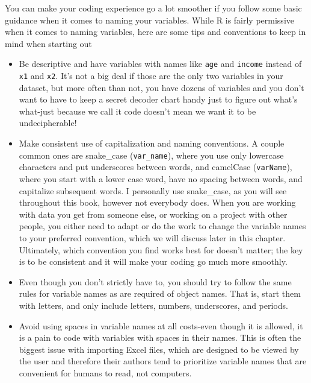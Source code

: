 \documentclass[
  letterpaper,
]{book}
\begin{document}
\begin{tcolorbox}[enhanced jigsaw, colframe=quarto-callout-tip-color-frame, breakable, arc=.35mm, bottomtitle=1mm, bottomrule=.15mm, colbacktitle=quarto-callout-tip-color!10!white, rightrule=.15mm, colback=white, opacityback=0, opacitybacktitle=0.6, coltitle=black, left=2mm, toptitle=1mm, toprule=.15mm, titlerule=0mm, leftrule=.75mm, title=\textcolor{quarto-callout-tip-color}{\faLightbulb}\hspace{0.5em}{Tip from the Helpdesk: What's in a Name?}]

You can make your coding experience go a lot smoother if you follow some
basic guidance when it comes to naming your variables. While R is fairly
permissive when it comes to naming variables, here are some tips and
conventions to keep in mind when starting out

\begin{itemize}
\item
  Be descriptive and have variables with names like \texttt{age} and
  \texttt{income} instead of \texttt{x1} and \texttt{x2}. It's not a big
  deal if those are the only two variables in your dataset, but more
  often than not, you have dozens of variables and you don't want to
  have to keep a secret decoder chart handy just to figure out what's
  what-just because we call it code doesn't mean we want it to be
  undecipherable!
\item
  Make consistent use of capitalization and naming conventions. A couple
  common ones are snake\_case (\texttt{var\_name}), where you use only
  lowercase characters and put underscores between words, and camelCase
  (\texttt{varName}), where you start with a lower case word, have no
  spacing between words, and capitalize subsequent words. I personally
  use snake\_case, as you will see throughout this book, however not
  everybody does. When you are working with data you get from someone
  else, or working on a project with other people, you either need to
  adapt or do the work to change the variable names to your preferred
  convention, which we will discuss later in this chapter. Ultimately,
  which convention you find works best for doesn't matter; the key is to
  be consistent and it will make your coding go much more smoothly.
\item
  Even though you don't strictly have to, you should try to follow the
  same rules for variable names as are required of object names. That
  is, start them with letters, and only include letters, numbers,
  underscores, and periods.
\item
  Avoid using spaces in variable names at all costs-even though it is
  allowed, it is a pain to code with variables with spaces in their
  names. This is often the biggest issue with importing Excel files,
  which are designed to be viewed by the user and therefore their
  authors tend to prioritize variable names that are convenient for
  humans to read, not computers.
\end{itemize}

\end{tcolorbox}
\end{document}
